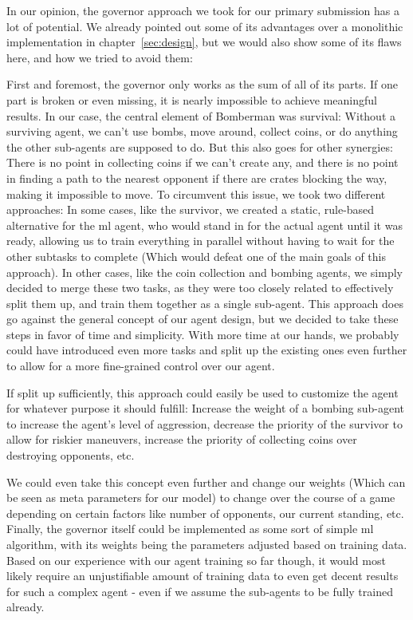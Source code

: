 In our opinion, the governor approach we took for our primary submission has a lot of potential.
We already pointed out some of its advantages over a monolithic implementation in chapter~\ref{sec:design}, but we would
also show some of its flaws here, and how we tried to avoid them:

First and foremost, the governor only works as the sum of all of its parts.
If one part is broken or even missing, it is nearly impossible to achieve meaningful results.
In our case, the central element of Bomberman was survival: Without a surviving agent, we can't use bombs, move around,
collect coins, or do anything the other sub-agents are supposed to do.
But this also goes for other synergies: There is no point in collecting coins if we can't create any, and there is no
point in finding a path to the nearest opponent if there are crates blocking the way, making it impossible to move.
To circumvent this issue, we took two different approaches:
In some cases, like the survivor, we created a static, rule-based alternative for the \gls{ml} agent, who would stand in
for the actual agent until it was ready, allowing us to train everything in parallel without having to wait for the
other subtasks to complete (Which would defeat one of the main goals of this approach).
In other cases, like the coin collection and bombing agents, we simply decided to merge these two tasks, as they were
too closely related to effectively split them up, and train them together as a single sub-agent.
This approach does go against the general concept of our agent design, but we decided to take these steps in favor of
time and simplicity.
With more time at our hands, we probably could have introduced even more tasks and split up the existing ones even
further to allow for a more fine-grained control over our agent.

If split up sufficiently, this approach could easily be used to customize the agent for whatever purpose it should
fulfill: Increase the weight of a bombing sub-agent to increase the agent's level of aggression, decrease the priority
of the survivor to allow for riskier maneuvers, increase the priority of collecting coins over destroying opponents,
etc.

We could even take this concept even further and change our weights (Which can be seen as meta parameters for our model)
to change over the course of a game depending on certain factors like number of opponents, our current standing, etc.
Finally, the governor itself could be implemented as some sort of simple \gls{ml} algorithm, with its weights being the
parameters adjusted based on training data.
Based on our experience with our agent training so far though, it would most likely require an unjustifiable amount of
training data to even get decent results for such a complex agent - even if we assume the sub-agents to be fully trained
already.

